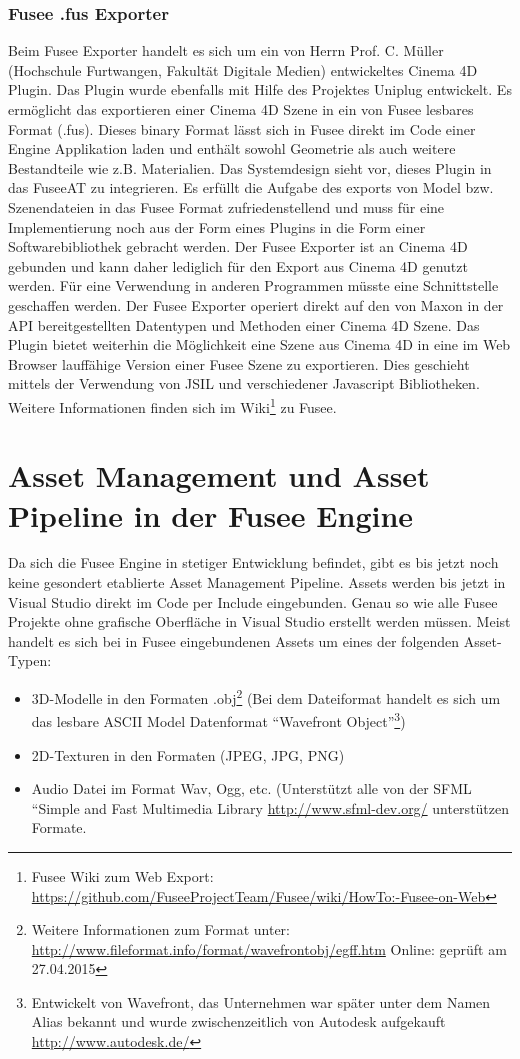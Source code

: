 \documentclass[pagesize, paper=a4, fontsize=12pt, titlepage=true, headings=small, headnosepline, abstractoff, liststotoc, nochapterprefix, plainheadsepline, twoside]{scrreprt}
\begin{document}
\subsubsection{Fusee .fus Exporter}
Beim Fusee Exporter handelt es sich um ein von Herrn Prof. C. Müller (Hochschule Furtwangen, Fakultät Digitale Medien) entwickeltes Cinema 4D Plugin. Das Plugin wurde ebenfalls mit Hilfe des Projektes Uniplug entwickelt. Es ermöglicht das exportieren einer Cinema 4D Szene in ein von Fusee lesbares Format (.fus). Dieses binary Format lässt sich in Fusee direkt im Code einer Engine Applikation laden und enthält sowohl Geometrie als auch weitere Bestandteile wie z.B. Materialien. Das Systemdesign sieht vor, dieses Plugin in das FuseeAT zu integrieren. Es erfüllt die Aufgabe des exports von Model bzw. Szenendateien in das Fusee Format zufriedenstellend und muss für eine Implementierung noch aus der Form eines Plugins in die Form einer Softwarebibliothek gebracht werden. Der Fusee Exporter ist an Cinema 4D gebunden und kann daher lediglich für den Export aus Cinema 4D genutzt werden. Für eine Verwendung in anderen Programmen müsste eine Schnittstelle geschaffen werden. Der Fusee Exporter operiert direkt auf den von Maxon in der API bereitgestellten Datentypen und Methoden einer Cinema 4D Szene.
Das Plugin bietet weiterhin die Möglichkeit eine Szene aus Cinema 4D in eine im Web Browser lauffähige Version einer Fusee Szene zu exportieren. Dies geschieht mittels der Verwendung von JSIL und verschiedener Javascript Bibliotheken. Weitere Informationen finden sich im Wiki\footnote{Fusee Wiki zum Web Export: \url{https://github.com/FuseeProjectTeam/Fusee/wiki/HowTo:-Fusee-on-Web}} zu Fusee.

\section{Asset Management und Asset Pipeline in der Fusee Engine}
Da sich die Fusee Engine in stetiger Entwicklung befindet, gibt es bis jetzt noch keine gesondert etablierte Asset Management Pipeline. Assets werden bis jetzt in Visual Studio direkt im Code per Include eingebunden. Genau so wie alle Fusee Projekte ohne grafische Oberfläche in Visual Studio erstellt werden müssen. Meist handelt es sich bei in Fusee eingebundenen Assets um eines der folgenden Asset-Typen:
\begin{itemize}
\item 3D-Modelle in den Formaten .obj\footnote{Weitere Informationen zum Format unter: \url{http://www.fileformat.info/format/wavefrontobj/egff.htm} Online: geprüft am 27.04.2015} (Bei dem Dateiformat handelt es sich um das lesbare ASCII Model Datenformat “Wavefront Object”\footnote{Entwickelt von Wavefront, das Unternehmen war später unter dem Namen Alias bekannt und wurde zwischenzeitlich von Autodesk aufgekauft \url{http://www.autodesk.de/}})
\item 2D-Texturen in den Formaten (JPEG, JPG, PNG)
\item Audio Datei im Format Wav, Ogg, etc. (Unterstützt alle von der SFML “Simple and Fast Multimedia Library \url{http://www.sfml-dev.org/} unterstützen Formate.
\end{itemize}
\end{document}
